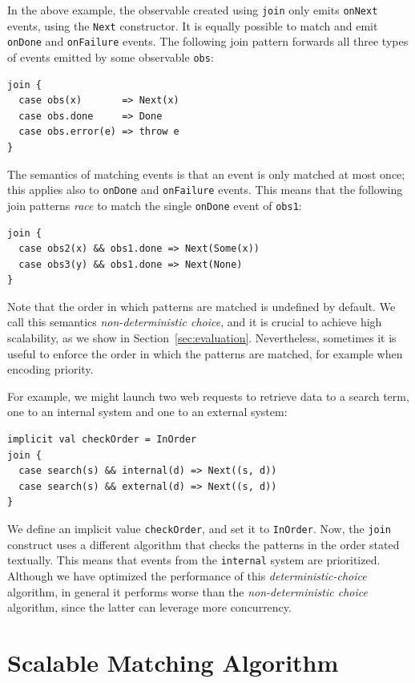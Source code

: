 \documentclass[runningheads]{llncs}
\begin{document}
\begin{sloppypar}
In the above example, the observable created using \verb|join| only emits
\verb|onNext| events, using the \verb|Next| constructor. It is equally
possible to match and emit \verb|onDone| and \verb|onFailure| events. The
following join pattern forwards all three types of events emitted by some
observable \verb|obs|:

\begin{lstlisting}
join {
  case obs(x)       => Next(x)
  case obs.done     => Done
  case obs.error(e) => throw e
}
\end{lstlisting}

\noindent
The semantics of matching events is that an event is only matched at most
once; this applies also to \verb|onDone| and \verb|onFailure| events. This
means that the following join patterns {\em race} to match the single
\verb|onDone| event of \verb|obs1|:

\begin{lstlisting}
join {
  case obs2(x) && obs1.done => Next(Some(x))
  case obs3(y) && obs1.done => Next(None)
}
\end{lstlisting}

\noindent
Note that the order in which patterns are matched is undefined by default. We
call this semantics \emph{non-deterministic choice}, and it is crucial to
achieve high scalability, as we show in Section~\ref{sec:evaluation}.
Nevertheless, sometimes it is useful to enforce the order in which the
patterns are matched, for example when encoding priority.

For example, we might launch two web requests to retrieve data to a search
term, one to an internal system and one to an external system:

\begin{lstlisting}
implicit val checkOrder = InOrder
join {
  case search(s) && internal(d) => Next((s, d))
  case search(s) && external(d) => Next((s, d))
}
\end{lstlisting}

\noindent
We define an implicit value \verb|checkOrder|, and set it to \verb|InOrder|.
Now, the \verb|join| construct uses a different algorithm that checks the
patterns in the order stated textually. This means that events from the
\verb|internal| system are prioritized. Although we have optimized the
performance of this {\em deterministic-choice} algorithm, in general it
performs worse than the {\em non-deterministic choice} algorithm, since the
latter can leverage more concurrency.


\section{Scalable Matching Algorithm}\label{sec:algorithm}


\end{sloppypar}
\end{document}
